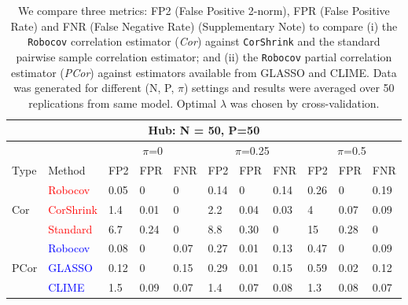 \documentclass{bioinfo}
\def\CorShrink{\texttt{CorShrink}}
\def\Robocov{\texttt{Robocov}}
\begin{document}


\small
\begin{table}[h]
\caption{{We compare three metrics: FP2 (False Positive 2-norm), FPR (False Positive Rate) and FNR (False Negative Rate) (Supplementary Note) to compare (i) the  \Robocov{} correlation estimator (\textit{Cor}) against \CorShrink{} and the standard pairwise sample correlation estimator; and (ii) the \Robocov{} partial correlation estimator (\textit{PCor})  against estimators available from GLASSO and CLIME. Data was generated for different (N, P, $\pi$) settings and results were averaged over 50 replications from same model. Optimal $\lambda$ was chosen by cross-validation.}}
\label{tab:tab1} 
\begin{tabular}[!t]{|p{0.5cm}|p{1.1cm}|p{0.4cm}|p{0.45cm}|p{0.45cm}|p{0.4cm}|p{0.45cm}|p{0.45cm}|p{0.4cm}|p{0.45cm}|p{0.45cm}|}
\hline 
\multicolumn{11}{|c|}{Hub: N = 50, P=50} \\ \hline
& & \multicolumn{3}{c|}{$\pi$=0} & \multicolumn{3}{c|}{$\pi$=0.25} & \multicolumn{3}{c|}{$\pi$=0.5} \\ \hline
 Type & Method & FP2 & FPR & FNR &  FP2 & FPR & FNR & FP2 & FPR & FNR \\ \hline 
\multirow{ 3}{*}{Cor} & \textcolor{red}{Robocov} & 0.05 &   0 &   0  & 0.14 &   0 & 0.14 & 0.26 &   0 & 0.19 \\
& \textcolor{red}{CorShrink} & 1.4 & 0.01 &  0 & 2.2 & 0.04 & 0.03 &  4 & 0.07 & 0.09 \\
& \textcolor{red}{Standard} & 6.7 & 0.24 &  0  & 8.8 & 0.30 &  0 &  15 & 0.28 & 0 \\  \hline 
\multirow{ 3}{*}{PCor} & \textcolor{blue}{Robocov} & 0.08 & 0 & 0.07 & 0.27 & 0.01 & 0.13 & 0.47 & 0 & 0.09 \\
& \textcolor{blue}{GLASSO} & 0.12 & 0 & 0.15 & 0.29 & 0.01 & 0.15 & 0.59 & 0.02 & 0.12 \\
& \textcolor{blue}{CLIME} & 1.5 & 0.09 & 0.07 & 1.4 & 0.07 & 0.08 & 1.3 & 0.08 & 0.07 \\ \hline 

\end{tabular}
\end{table}
\end{document}
